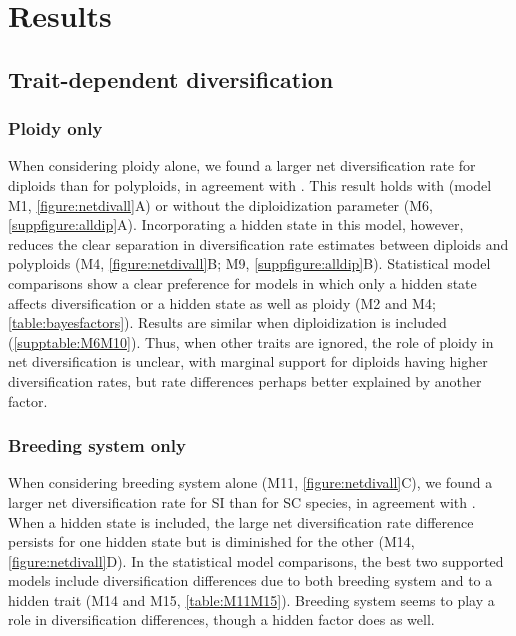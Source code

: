 \section{Results}


\subsection{Trait-dependent diversification}

\subsubsection{Ploidy only}

When considering ploidy alone, we found a larger net diversification rate for diploids than for polyploids, in agreement with \citet{mayrose_2011, mayrose_2015}.
This result holds with (model M1, \cref{figure:netdivall}A) or without the diploidization parameter (M6, \cref{suppfigure:alldip}A).
Incorporating a hidden state in this model, however, reduces the clear separation in diversification rate estimates between diploids and polyploids (M4, \cref{figure:netdivall}B; M9, \cref{suppfigure:alldip}B).
Statistical model comparisons show a clear preference for models in which only a hidden state affects diversification or a hidden state as well as ploidy (M2 and M4; \cref{table:bayesfactors}).
Results are similar when diploidization is included (\cref{supptable:M6M10}).
Thus, when other traits are ignored, the role of ploidy in net diversification is unclear, with marginal support for diploids having higher diversification rates, but rate differences perhaps better explained by another factor. %

\subsubsection{Breeding system only}

When considering breeding system alone (M11, \cref{figure:netdivall}C), we found a larger net diversification rate for SI than for SC species, in agreement with \citet{goldberg_2010}.
When a hidden state is included, the large net diversification rate difference persists for one hidden state but is diminished for the other (M14, \cref{figure:netdivall}D).
In the statistical model comparisons, the best two supported models include diversification differences due to both breeding system and to a hidden trait (M14 and M15, \cref{table:M11M15}). %
Breeding system seems to play a role in diversification differences, though a hidden factor does as well.


